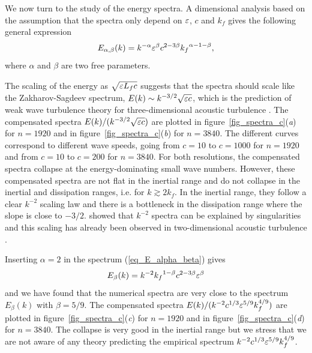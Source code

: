 We now turn to the study of the energy spectra.  A dimensional
analysis based on the assumption that the spectra only depend on
$\varepsilon$, $c$ and $k_f$ gives the following general expression
\begin{equation}
E_{\alpha, \beta}(k) = k^{-\alpha} \varepsilon^\beta   c^{2- 3\beta} 
{k_f}^{\alpha -1 - \beta}, \label{eq_E_alpha_beta}
\end{equation}
where $\alpha$ and $\beta$ are two free parameters.





The scaling of the energy as $\sqrt{\varepsilon L_f c}$ suggests that the
spectra should scale like the Zakharov-Sagdeev spectrum, $E(k) \sim
k^{-3/2}\sqrt{\varepsilon c}$, which is the prediction of weak wave
turbulence theory for three-dimensional acoustic turbulence
\cite[]{Nazarenko2011}.
%
The compensated spectra $E(k) / ( k^{-3/2}\sqrt{\varepsilon c})$ are plotted
in figure~\ref{fig_spectra_c}(\textit{a}) for $n = 1920$ and in
figure~\ref{fig_spectra_c}(\textit{b}) for $n = 3840$.  The different
curves correspond to different wave speeds, going from $c=10$ to
$c=1000$ for $n = 1920$ and from $c=10$ to $c=200$ for $n = 3840$.
%
For both resolutions, the compensated spectra collapse at the
energy-dominating small wave numbers.
%
However, these compensated spectra are not flat in the inertial range
and do not collapse in the inertial and dissipation ranges, i.e. for
$k\gtrsim 2k_f$.  In the inertial range, they follow a clear $k^{-2}$
scaling law and there is a bottleneck in the dissipation range where
the slope is close to $-3/2$.
%
\cite{Kuznetsov2004} showed that $k^{-2}$ spectra can be explained by
singularities and this scaling has already been observed in
two-dimensional acoustic turbulence \cite[]{FalkovichMeyer1996}.
%

Inserting $\alpha = 2$ in the spectrum (\ref{eq_E_alpha_beta}) gives
\begin{equation}
E_\beta(k) = k^{-2} {k_f}^{1-\beta} c^{2-3\beta} \varepsilon^\beta  
\end{equation}
and we have found that the numerical spectra are very close to the
spectrum $E_\beta(k)$ with $\beta = 5/9$.
%
The compensated spectra $E(k) / ( k^{-2} c^{1/3} \varepsilon^{5/9} k_f^{4/9}
)$ are plotted in figure~\ref{fig_spectra_c}(\textit{c}) for $n =
1920$ and in figure~\ref{fig_spectra_c}(\textit{d}) for $n = 3840$.
The collapse is very good in the inertial range but we stress that we
are not aware of any theory predicting the empirical spectrum $k^{-2}
c^{1/3} \varepsilon^{5/9} k_f^{4/9}$.







